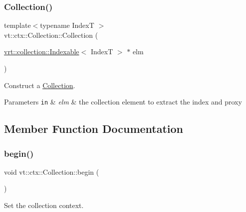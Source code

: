\subsubsection{\texorpdfstring{Collection()}{Collection()}\hspace{0.1cm}{\footnotesize\ttfamily [2/2]}}
{\footnotesize\ttfamily template$<$typename IndexT $>$ \\
vt\+::ctx\+::\+Collection\+::\+Collection (\begin{DoxyParamCaption}\item[{\hyperlink{structvt_1_1vrt_1_1collection_1_1_indexable}{vrt\+::collection\+::\+Indexable}$<$ IndexT $>$ $\ast$}]{elm }\end{DoxyParamCaption})\hspace{0.3cm}{\ttfamily [explicit]}}



Construct a {\ttfamily \hyperlink{structvt_1_1ctx_1_1_collection}{Collection}}. 


\begin{DoxyParams}[1]{Parameters}
\mbox{\tt in}  & {\em elm} & the collection element to extract the index and proxy \\
\hline
\end{DoxyParams}


\subsection{Member Function Documentation}
\mbox{\label{structvt_1_1ctx_1_1_collection_a35d61c84c87b9bc99143ac42353c3c20}} 
\subsubsection{\texorpdfstring{begin()}{begin()}}
{\footnotesize\ttfamily void vt\+::ctx\+::\+Collection\+::begin (\begin{DoxyParamCaption}{ }\end{DoxyParamCaption})}



Set the collection context. 

\mbox{\label{structvt_1_1ctx_1_1_collection_a0eb284fb05d2e4d36183afc753038ec3}} 
